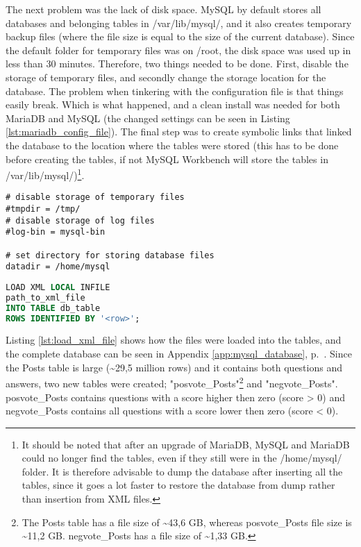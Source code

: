 \noindent
The next problem was the lack of disk space. 
MySQL by default stores all databases and belonging tables in /var/lib/mysql/, and it also creates temporary backup files 
(where the file size is equal to the size of the current database). 
Since the default folder for temporary files was on /root, the disk space was used up in less than 30 minutes. 
Therefore, two things needed to be done. First, disable the storage of temporary files, and secondly change the storage location for the database. 
The problem when tinkering with the configuration file is that things easily break. 
Which is what happened, and a clean install was needed for both MariaDB and MySQL (the changed settings can be seen in Listing  \ref{lst:mariadb_config_file}). 
The final step was to create symbolic links that linked the database to the  location where the tables were stored 
(this has to be done before creating the tables, if not MySQL  Workbench will store the tables in /var/lib/mysql/)\footnote{
	It should be noted that after an upgrade of MariaDB, MySQL and MariaDB could no longer find the tables, even if they still were in the /home/mysql/ folder. 
	It is therefore advisable to dump the database after inserting all the tables, since it goes a lot faster to restore the database from dump rather than insertion from XML files.
	}. 
\begin{lstlisting}[caption={Changes made to config file: /etc/mysql/my.cnf}, label={lst:mariadb_config_file}] 
# disable storage of temporary files
#tmpdir = /tmp/		  
# disable storage of log files
#log-bin = mysql-bin  

# set directory for storing database files
datadir = /home/mysql 
\end{lstlisting}

\begin{lstlisting}[caption={Load XML file into a table in the MySQL database}, label={lst:load_xml_file}, language={SQL}] 
LOAD XML LOCAL INFILE 
path_to_xml_file
INTO TABLE db_table
ROWS IDENTIFIED BY '<row>';
\end{lstlisting}

\noindent
Listing \ref{lst:load_xml_file} shows how the files were loaded into the tables, and the complete database can be seen in Appendix \ref{app:mysql_database}, p.~\pageref{app:mysql_database}. 
Since the Posts table is large (\textasciitilde 29,5 million rows) and it contains both questions and answers, two new tables were created; 
"posvote\_Posts"\footnote{
	The Posts table has a file size of \textasciitilde 43,6 GB, 
	whereas posvote\_Posts file size is \textasciitilde 11,2 GB. 
	negvote\_Posts has a file size of \textasciitilde 1,33 GB.
	} 
and "negvote\_Posts". 
posvote\_Posts contains questions with a score higher then zero (score > 0) and negvote\_Posts contains all questions with a score lower then zero (score < 0).

